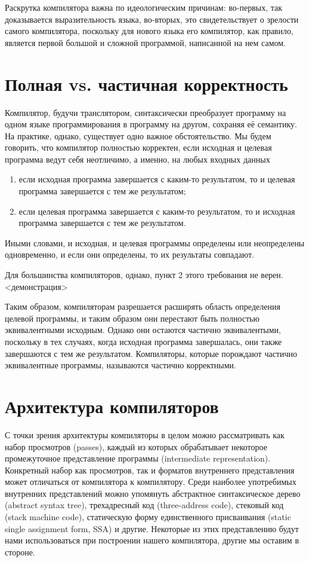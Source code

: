 \documentclass{article}
\begin{document}
Раскрутка компилятора важна по идеологическим причинам: во-первых, так доказывается выразительность языка, во-вторых, это
свидетельствует о зрелости самого компилятора, поскольку для нового языка его компилятор, как правило, является первой большой и сложной программой,
написанной на нем самом.

\section{Полная vs. частичная корректность}

Компилятор, будучи транслятором, синтаксически преобразует программу на одном языке программирования в программу на другом, сохраняя её семантику.
На практике, однако, существует одно важное обстоятельство. Мы будем говорить, что компилятор полностью корректен, если исходная и целевая программа
ведут себя неотличимо, а именно, на любых входных данных

\begin{enumerate}
\item если исходная программа завершается с каким-то результатом, то и
  целевая программа завершается с тем же результатом;
\item если целевая программа завершается с каким-то результатом, то и
  исходная программа завершается с тем же результатом.   
\end{enumerate}

Иными словами, и исходная, и целевая программы определены или неопределены одновременно, и если они определены, то их результаты совпадают.

Для большинства компиляторов, однако, пункт 2 этого требования не верен. <демонстрация>

Таким образом, компиляторам разрешается расширять область определения целевой программы, и таким образом они перестают быть полностью эквивалентными
исходным. Однако они остаются частично эквивалентыми, поскольку в тех случаях, когда исходная программа завершалась, они также
завершаются с тем же результатом. Компиляторы, которые порождают частично эквивалентные программы, называются частично корректными.

\section{Архитектура компиляторов}

С точки зрения архитектуры компиляторы в целом можно рассматривать как набор просмотров (passes), каждый из которых обрабатывает некоторое
промежуточное представление программы (intermediate representation). Конкретный набор как просмотров, так и форматов внутреннего представления
может отличаться от компилятора к компилятору. Среди наиболее употребимых внутренних представлений можно упомянуть абстрактное синтаксическое дерево
(abstract syntax tree), трехадресный код (three-address code), стековый код (stack machine code), статическую форму единственного присваивания (static
single assignment form, SSA) и другие. Некоторые из этих представлению будут нами использоваться при построении нашего компилятора, другие мы
оставим в стороне.
\end{document}
